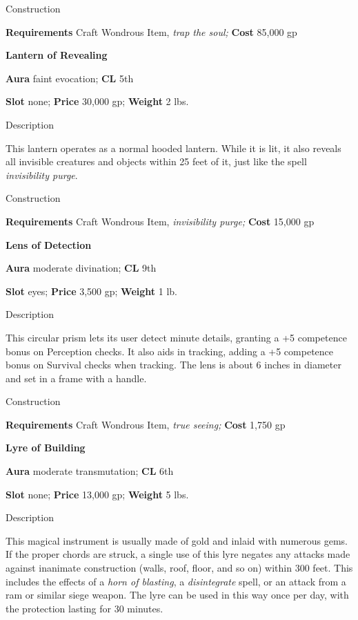 Construction
				
\textbf{Requirements} Craft Wondrous Item,\textit{ trap the soul;}\textbf{ Cost }85,000 gp
				
\textbf{Lantern of Revealing}
				
\textbf{Aura} faint evocation;\textbf{ CL }5th
				
\textbf{Slot} none; \textbf{Price} 30,000 gp; \textbf{Weight} 2 lbs.
				
Description
				
This lantern operates as a normal hooded lantern. While it is lit, it also reveals all invisible creatures and objects within 25 feet of it, just like the spell \textit{invisibility purge}. 
				
Construction
				
\textbf{Requirements} Craft Wondrous Item,\textit{ invisibility purge;}\textbf{ Cost }15,000 gp
				
\textbf{Lens of Detection}
				
\textbf{Aura} moderate divination;\textbf{ CL }9th
				
\textbf{Slot} eyes; \textbf{Price} 3,500 gp; \textbf{Weight} 1 lb.
				
Description
				
This circular prism lets its user detect minute details, granting a +5 competence bonus on Perception checks. It also aids in tracking, adding a +5 competence bonus on Survival checks when tracking. The lens is about 6 inches in diameter and set in a frame with a handle. 
				
Construction
				
\textbf{Requirements} Craft Wondrous Item,\textit{ true seeing;}\textbf{ Cost }1,750 gp
				
\textbf{Lyre of Building}
				
\textbf{Aura} moderate transmutation;\textbf{ CL }6th
				
\textbf{Slot} none; \textbf{Price} 13,000 gp; \textbf{Weight} 5 lbs.
				
Description
				
This magical instrument is usually made of gold and inlaid with numerous gems. If the proper chords are struck, a single use of this lyre negates any attacks made against inanimate construction (walls, roof, floor, and so on) within 300 feet. This includes the effects of a \textit{horn of blasting}, a \textit{disintegrate} spell, or an attack from a ram or similar siege weapon. The lyre can be used in this way once per day, with the protection lasting for 30 minutes.
				
